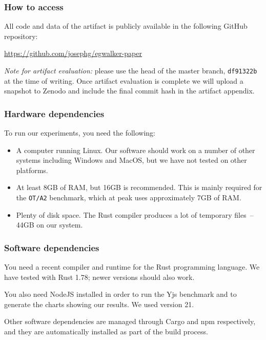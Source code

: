 \documentclass[sigplan,10pt]{acmart}
\begin{document}
\subsubsection{How to access}

All code and data of the artifact is publicly available in the following GitHub repository:

\url{https://github.com/josephg/egwalker-paper}

\textit{Note for artifact evaluation:} please use the head of the master branch, \texttt{df91322b} at the time of writing. Once artifact evaluation is complete we will upload a snapshot to Zenodo and include the final commit hash in the artifact appendix. %


\subsubsection{Hardware dependencies}

To run our experiments, you need the following:

\begin{itemize}
    \item A computer running Linux. Our software should work on a number of other systems including Windows and MacOS, but we have not tested on other platforms.
    \item At least 8GB of RAM, but 16GB is recommended. This is mainly required for the \texttt{OT/A2} benchmark, which at peak uses approximately 7GB of RAM.
    \item Plenty of disk space. The Rust compiler produces a lot of temporary files~-- 44GB on our system.
\end{itemize}

\subsubsection{Software dependencies}

You need a recent compiler and runtime for the Rust programming language. We have tested with Rust 1.78; newer versions should also work.

You also need NodeJS installed in order to run the Yjs benchmark and to generate the charts showing our results. We used version 21.

Other software dependencies are managed through Cargo and npm respectively, and they are automatically installed as part of the build process.
\end{document}
